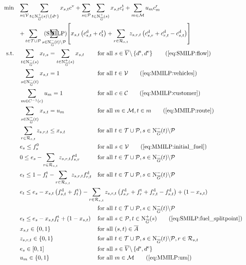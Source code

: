 \begin{align}
	\min \quad & \omit\rlap{$\displaystyle{\sum_{s\in\mathcal{V}} \sum_{t\in\Nouto(s)\backslash\{d^{\operatorname{e}}\}} x_{s,t}\cv + \sum_{s\in \mathcal{P}}\sum_{t\in\Nouto(s)} x_{s,t} \ct_t + \sum_{m\in\mathcal{M}} u_m \croute_m}$} \nonumber \\
	& \omit\rlap{$\displaystyle{ + \sum_{t\in\mathcal{T}\cup \mathcal{P}} \sum_{s\in\Nino(t)\backslash \mathcal{P}} \left[x_{s,t}\left(\cd_{s,t}+\ct_t\right) + \sum_{r\in\Rst} z_{s,r,t}\left(\cd_{s,r}+\cd_{r,t}-\cd_{s,t}\right)\right]}$} \tag{SMILP} \label{eq:SMILP} \\
	\text{s.t.} \quad & \sum_{t\in\Nino(s)} x_{t,s} = \sum_{t\in\Nouto(s)} x_{s,t} & & \text{for all } s\in \overline{V}\backslash\left\{d^{\operatorname{s}},d^{\operatorname{e}}\right\} \tag{\ref{eq:SMILP:flow}} \\
	& \sum_{s\in\Nino(t)} x_{s,t} = 1 & & \text{for all } t\in\mathcal{V} \tag{\ref{eq:MMILP:vehicles}} \\
	& \sum_{m\in C^{-1}(c)} u_m = 1 && \text{for all } c\in\mathcal{C} \tag{\ref{eq:MMILP:customer}} \\
	& \sum_{s\in\Nino(t)} x_{s,t} = u_m && \text{for all } m\in\mathcal{M},t\in m \tag{\ref{eq:MMILP:route}} \\
	& \sum_{r\in\Rst} z_{s,r,t} \leq x_{s,t} & & \text{for all } t\in\mathcal{T}\cup \mathcal{P}, s\in\Nino(t)\backslash \mathcal{P} \label{eq:SMILP:refuel} \\
	& e_s \leq f_s^0 & & \text{for all } s\in\mathcal{V} \tag{\ref{eq:MMILP:initial_fuel}} \\
	& 0 \leq e_s - \sum_{r\in\Rst} z_{s,r,t}\fd_{s,r} & & \text{for all } t\in\mathcal{T}\cup \mathcal{P}, s\in\Nino(t)\backslash \mathcal{P} \label{eq:SMILP:min_fuel} \\
	& e_t \leq 1 - \ft_t - \sum_{r\in\Rst} z_{s,r,t}\fd_{r,t} & & \text{for all } t\in\mathcal{T}\cup \mathcal{P}, s\in\Nino(t)\backslash \mathcal{P} \label{eq:SMILP:max_fuel} \\
	& \omit\rlap{$\displaystyle{e_t \leq e_s - x_{s,t}\left(f_{s,t}^{\operatorname{d}}+f_t^{\operatorname{t}}\right) - \sum_{r\in\Rst} z_{s,r,t}\left(\fd_{s,r}+\ft_r+\fd_{r,t}-\fd_{s,t}\right) + \left(1-x_{s,t}\right)}$} \nonumber \\
	& & & \text{for all } t\in\mathcal{T}\cup \mathcal{P}, s\in\Nino(t)\backslash \mathcal{P} \label{eq:SMILP:fuel_consumption} \\
	& e_t \leq e_s-x_{s,t}\ft_t+\left(1-x_{s,t}\right) && \text{for all } s\in \mathcal{P},t\in\Nouto(s) \tag{\ref{eq:SMILP:fuel_splitpoint}} \\
	& x_{s,t}\in\{0,1\} & & \text{for all } (s,t)\in\overline{A} \\
	& z_{s,r,t}\in\{0,1\} & & \text{for all } t\in\mathcal{T}\cup \mathcal{P},s\in\Nino(t)\backslash \mathcal{P},r\in\Rst \\
	& e_s\in[0,1] & & \text{for all } s\in\overline{V}\backslash\left\{d^{\operatorname{s}},d^{\operatorname{e}}\right\} \\
	& u_m \in\{0,1\} && \text{for all } m\in\mathcal{M} \tag{\ref{eq:MMILP:um}}
\end{align}

